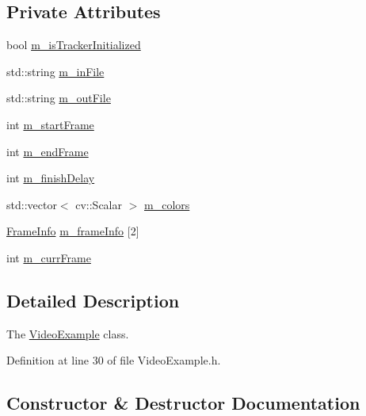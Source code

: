 \subsection*{Private Attributes}
\begin{DoxyCompactItemize}
\item 
bool \mbox{\hyperlink{class_video_example_ac39c29e82360b1100d09b72b61c7c461}{m\+\_\+is\+Tracker\+Initialized}}
\item 
std\+::string \mbox{\hyperlink{class_video_example_ac536e84dec6f9be505779689322b42ca}{m\+\_\+in\+File}}
\item 
std\+::string \mbox{\hyperlink{class_video_example_a4234fb0df2f009bc3f651f01cbd5bde5}{m\+\_\+out\+File}}
\item 
int \mbox{\hyperlink{class_video_example_a98dbe94b8827c5a1898e3a9423cce402}{m\+\_\+start\+Frame}}
\item 
int \mbox{\hyperlink{class_video_example_ae44e854b8a76b3d4f6393582afd70e67}{m\+\_\+end\+Frame}}
\item 
int \mbox{\hyperlink{class_video_example_ac21a646c343edd4c11db034fa2c8c085}{m\+\_\+finish\+Delay}}
\item 
std\+::vector$<$ cv\+::\+Scalar $>$ \mbox{\hyperlink{class_video_example_a2b6d4a6e85d52d13d8899c57cc6ddc66}{m\+\_\+colors}}
\item 
\mbox{\hyperlink{struct_video_example_1_1_frame_info}{Frame\+Info}} \mbox{\hyperlink{class_video_example_af5363ad3ed9a34bd105dbdaf274acb66}{m\+\_\+frame\+Info}} \mbox{[}2\mbox{]}
\item 
int \mbox{\hyperlink{class_video_example_a4adccbe4084f68f10d966901b168a98a}{m\+\_\+curr\+Frame}}
\end{DoxyCompactItemize}


\subsection{Detailed Description}
The \mbox{\hyperlink{class_video_example}{Video\+Example}} class. 

Definition at line 30 of file Video\+Example.\+h.



\subsection{Constructor \& Destructor Documentation}
\mbox{\label{class_video_example_aedc40ab44835e8ad1cf731b7709cd4ac}} 
